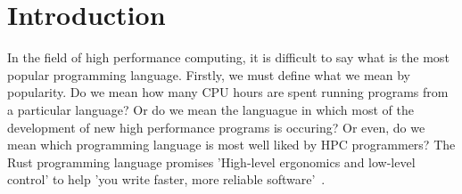 \chapter{Introduction}
In the field of high performance computing, it is difficult to say what is the most popular programming language. Firstly, we must define what we mean by popularity. Do we mean how many CPU hours are spent running programs from a particular language? Or do we mean the languague in which most of the development of new high performance programs is occuring? Or even, do we mean which programming language is most well liked by HPC programmers?
The Rust programming language promises 'High-level ergonomics and low-level control' to help 'you write faster, more reliable software'~\cite{RustBook}.
